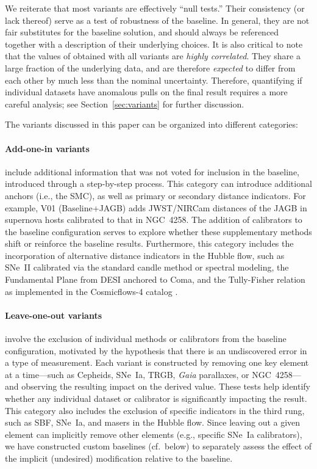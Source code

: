 We reiterate that most variants are effectively ``null tests.''  Their consistency (or lack thereof) serve as a test of robustness of the baseline.  In general, they are not fair substitutes for the baseline solution, and should always be referenced together with a description of their underlying choices.  It is also critical to note that the values of {\Hcst} obtained with all variants are \textit{highly correlated}.  They share a large fraction of the underlying data, and are therefore \textit{expected} to differ from each other by much less than the nominal uncertainty.  Therefore, quantifying if individual datasets have anomalous pulls on the final result requires a more careful analysis; see Section~\ref{sec:variants} for further discussion. 

The variants discussed in this paper can be organized into different categories:

\paragraph{Add-one-in variants} include additional information that was not voted for inclusion in the baseline, introduced through a step-by-step process. This category can  introduce additional anchors (i.e., the SMC), as well as primary or secondary distance indicators. For example, V01 (Baseline+JAGB) adds JWST/NIRCam distances of the JAGB in supernova hosts calibrated to that in NGC~4258. The addition of calibrators to the baseline configuration serves to explore whether these supplementary methods shift or reinforce the baseline results. Furthermore, this category includes the incorporation of alternative distance indicators in the Hubble flow, such as SNe~II calibrated via the standard candle method or spectral modeling, the Fundamental Plane from DESI anchored to Coma, and the Tully-Fisher relation as implemented in the Cosmicflows-4 catalog \citep[CF4;][]{2020ApJ...902..145K}. 

\paragraph{Leave-one-out variants} involve the exclusion of individual methods or calibrators from the baseline configuration, motivated by the hypothesis that there is an undiscovered error in a type of measurement. Each variant is constructed by removing one key element at a time—such as Cepheids, SNe~Ia, TRGB, {\it Gaia} parallaxes, or NGC~4258—and observing the resulting impact on the derived {\Hcst} value. These tests help identify whether any individual dataset or calibrator is significantly impacting the result. This category also includes the exclusion of specific indicators in the third rung, such as SBF, SNe~Ia, and masers in the Hubble flow.  Since leaving out a given element can implicitly remove other elements (e.g., specific SNe~Ia calibrators), we have constructed custom baselines (cf.~below) to separately assess the effect of the implicit (undesired) modification relative to the baseline.

